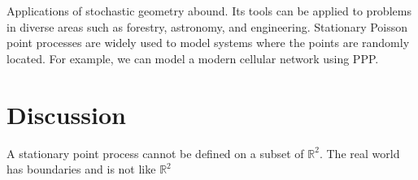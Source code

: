 \documentclass[]{article}
\begin{document}
Applications of stochastic geometry abound. Its tools can be applied to problems in diverse areas such as forestry, astronomy, and engineering. Stationary Poisson point processes are widely used to model systems where the points are randomly located. For example, we can model a modern cellular network using PPP.

 

\section{Discussion}
 A stationary point process cannot be defined on a subset of $\mathbb{R}^2$. The real world has boundaries and is not like $\mathbb{R}^2$
\end{document}

